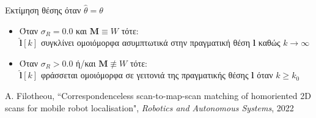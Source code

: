 \begin{frame}{Εκτίμηση θέσης όταν $\hat{\theta} = \theta$}

  \vspace{1cm}


  \begin{itemize}
    \item Όταν $\sigma_R = 0.0$ και $\bm{M}\equiv W$ τότε: \\
          $\hat{\bm{l}}[k]$ συγκλίνει ομοιόμορφα ασυμπτωτικά στην πραγματική θέση $\bm{l}$ καθώς $k \rightarrow \infty$ \vspace{0.25cm}
    \item Όταν $\sigma_R > 0.0$ ή/και $\bm{M} \not\equiv W$ τότε: \\
          $\hat{\bm{l}}[k]$ φράσσεται ομοιόμορφα σε γειτονιά της πραγματικής θέσης $\bm{l}$ όταν $k \geq k_0$
  \end{itemize}

  \placebottom
  \tiny A. Filotheou, ``Correspondenceless scan-to-map-scan matching of homoriented 2D scans for mobile robot localisation", \textit{Robotics and Autonomous Systems}, 2022

\end{frame}
